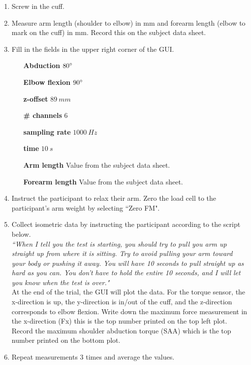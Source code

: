 \documentclass[11pt]{article}
\begin{document}
\begin{enumerate}
\item Screw in the cuff.
\item Measure arm length (shoulder to elbow) in mm and forearm length (elbow to mark on the cuff) in mm. Record this on the subject data sheet.
\item Fill in the fields in the upper right corner of the GUI. 
	\begin{enumerate}
	\item [\textbf{Abduction}] $80\degree $
	\item [\textbf{Elbow flexion}] $90\degree$
	\item [\textbf{z-offset}] $89\ mm$
	\item [\textbf{\# channels}]$6$
	\item[\textbf{sampling rate}] $1000\ Hz$
	\item [\textbf{time}] $10\ s$
	\item [\textbf{Arm length}] Value from the subject data sheet. 
	\item [\textbf{Forearm length}] Value from the subject data sheet.
	\end{enumerate}
\item Instruct the participant to relax their arm. Zero the load cell to the participant's arm weight by selecting ``Zero FM".
\item Collect isometric data by instructing the participant according to the script below.\\

	\textit{``When I tell you the test is starting, you should try to pull you arm up straight up from where it is sitting. Try to avoid pulling your arm toward your body or pushing it away. You will have 10 seconds to pull straight up as hard as you can. You don't have to hold the entire 10 seconds, and I will let you know when the test is over."}\\
	
At the end of the trial, the GUI will plot the data. For the torque sensor, the x-direction is up, the y-direction is in/out of the cuff, and the z-direction corresponds to elbow flexion.
Write down the maximum force measurement in the x-direction (Fx) this is the top number printed on the top left plot.  Record the maximum shoulder abduction torque (SAA) which is the top number printed on the bottom plot.
\item Repeat measurements 3 times and average the values.
\end{enumerate}
\end{document}
